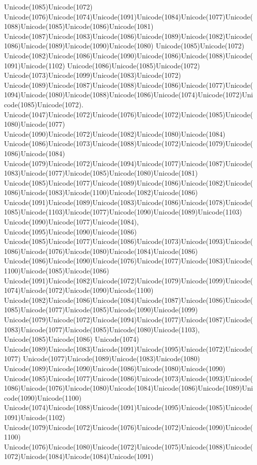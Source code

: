 \documentclass[a4paper,11pt]{report}
\begin{document}
{{Unicode(1085)Unicode(1072)
Unicode(1076)Unicode(1074)Unicode(1091)Unicode(1084)Unicode(1077)Unicode(1088)Unicode(1085)Unicode(1086)Unicode(1081)
Unicode(1087)Unicode(1083)Unicode(1086)Unicode(1089)Unicode(1082)Unicode(1086)Unicode(1089)Unicode(1090)Unicode(1080)
Unicode(1085)Unicode(1072)
Unicode(1082)Unicode(1086)Unicode(1090)Unicode(1086)Unicode(1088)Unicode(1091)Unicode(1102)
Unicode(1086)Unicode(1085)Unicode(1072)
Unicode(1073)Unicode(1099)Unicode(1083)Unicode(1072)
Unicode(1089)Unicode(1087)Unicode(1088)Unicode(1086)Unicode(1077)Unicode(1094)Unicode(1080)Unicode(1088)Unicode(1086)Unicode(1074)Unicode(1072)Unicode(1085)Unicode(1072).
Unicode(1047)Unicode(1072)Unicode(1076)Unicode(1072)Unicode(1085)Unicode(1080)Unicode(1077)
Unicode(1090)Unicode(1072)Unicode(1082)Unicode(1080)Unicode(1084)
Unicode(1086)Unicode(1073)Unicode(1088)Unicode(1072)Unicode(1079)Unicode(1086)Unicode(1084)
Unicode(1079)Unicode(1072)Unicode(1094)Unicode(1077)Unicode(1087)Unicode(1083)Unicode(1077)Unicode(1085)Unicode(1080)Unicode(1081)
Unicode(1085)Unicode(1077)Unicode(1089)Unicode(1086)Unicode(1082)Unicode(1086)Unicode(1083)Unicode(1100)Unicode(1082)Unicode(1086)
Unicode(1091)Unicode(1089)Unicode(1083)Unicode(1086)Unicode(1078)Unicode(1085)Unicode(1103)Unicode(1077)Unicode(1090)Unicode(1089)Unicode(1103)
Unicode(1090)Unicode(1077)Unicode(1084),
Unicode(1095)Unicode(1090)Unicode(1086)
Unicode(1085)Unicode(1077)Unicode(1086)Unicode(1073)Unicode(1093)Unicode(1086)Unicode(1076)Unicode(1080)Unicode(1084)Unicode(1086)
Unicode(1086)Unicode(1090)Unicode(1076)Unicode(1077)Unicode(1083)Unicode(1100)Unicode(1085)Unicode(1086)
Unicode(1091)Unicode(1082)Unicode(1072)Unicode(1079)Unicode(1099)Unicode(1074)Unicode(1072)Unicode(1090)Unicode(1100)
Unicode(1082)Unicode(1086)Unicode(1084)Unicode(1087)Unicode(1086)Unicode(1085)Unicode(1077)Unicode(1085)Unicode(1090)Unicode(1099)
Unicode(1079)Unicode(1072)Unicode(1094)Unicode(1077)Unicode(1087)Unicode(1083)Unicode(1077)Unicode(1085)Unicode(1080)Unicode(1103),
Unicode(1085)Unicode(1086) Unicode(1074)
Unicode(1089)Unicode(1083)Unicode(1091)Unicode(1095)Unicode(1072)Unicode(1077)
Unicode(1077)Unicode(1089)Unicode(1083)Unicode(1080)
Unicode(1089)Unicode(1090)Unicode(1086)Unicode(1080)Unicode(1090)
Unicode(1085)Unicode(1077)Unicode(1086)Unicode(1073)Unicode(1093)Unicode(1086)Unicode(1076)Unicode(1080)Unicode(1084)Unicode(1086)Unicode(1089)Unicode(1090)Unicode(1100)
Unicode(1074)Unicode(1088)Unicode(1091)Unicode(1095)Unicode(1085)Unicode(1091)Unicode(1102)
Unicode(1079)Unicode(1072)Unicode(1076)Unicode(1072)Unicode(1090)Unicode(1100)
Unicode(1076)Unicode(1080)Unicode(1072)Unicode(1075)Unicode(1088)Unicode(1072)Unicode(1084)Unicode(1084)Unicode(1091)
}}
\end{document}
